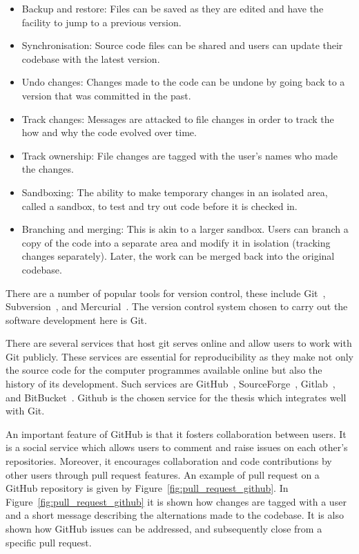 \begin{itemize}
    \item Backup and restore: Files can be saved as they are edited and have the facility to
    jump to a previous version.
    \item Synchronisation: Source code files can be shared and users can update their
    codebase with the latest version.
    \item Undo changes: Changes made to the code can be undone by going back
    to a version that was committed in the past.
    \item Track changes: Messages are attacked to file changes in order to track the
    how and why the code evolved over time.
    \item Track ownership: File changes are tagged with the user's names who made
    the changes.
    \item Sandboxing: The ability to make temporary changes in an isolated area,
    called a sandbox, to test and try out code before it is checked in.
    \item Branching and merging: This is akin to a larger sandbox. Users can
    branch a copy of the code into a separate area and modify it in
    isolation (tracking changes separately). Later, the work can be merged back
    into the original codebase.
\end{itemize}

There are a number of popular tools for version control, these include Git~\cite{git},
Subversion~\cite{subversion}, and Mercurial~\cite{mercurial}. The version
control system chosen to carry out the software development here is Git.

There are several services that host git serves online and allow users to work
with Git publicly. These services are essential for reproducibility as they make
not only the source code for the computer programmes available online but also
the history of its development. Such services are GitHub~\cite{github},
SourceForge~\cite{sourceforge}, Gitlab~\cite{gitlab}, and BitBucket~\cite{bitbucket}.
Github is the chosen service for the thesis which integrates well with Git.

An important feature of GitHub is that it fosters collaboration between users.
It is a social service which allows users to comment and raise issues on each
other's repositories. Moreover, it encourages collaboration and code contributions
by other users through pull request features. An example of pull request on
a GitHub repository is given by Figure~\ref{fig:pull_request_github}. In Figure~\ref{fig:pull_request_github}
it is shown how changes are tagged with a user and a short message describing
the alternations made to the codebase. It is also shown how GitHub issues can be
addressed, and subsequently close from a specific pull request.

